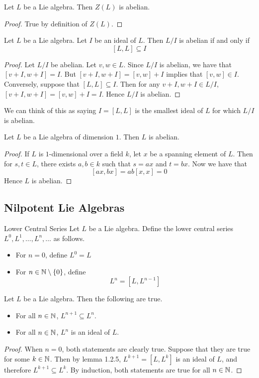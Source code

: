 \documentclass[a4paper]{article}
\begin{document}
\begin{lmm}{}{} Let $L$ be a Lie algebra. Then $Z(L)$ is abelian. \tcbline
\begin{proof}
True by definition of $Z(L)$. 
\end{proof}
\end{lmm}

\begin{lmm}{}{} Let $L$ be a Lie algebra. Let $I$ be an ideal of $L$. Then $L/I$ is abelian if and only if $$[L,L]\subseteq I$$ \tcbline
\begin{proof}
Let $L/I$ be abelian. Let $v,w\in L$. Since $L/I$ is abelian, we have that $[v+I,w+I]=I$. But $[v+I,w+I]=[v,w]+I$ implies that $[v,w]\in I$. Conversely, suppose that $[L,L]\subseteq I$. Then for any $v+I,w+I\in L/I$, $[v+I,w+I]=[v,w]+I=I$. Hence $L/I$ is abelian. 
\end{proof}
\end{lmm}

We can think of this as saying $I=[L,L]$ is the smallest ideal of $L$ for which $L/I$ is abelian. 

\begin{prp}{}{} Let $L$ be a Lie algebra of dimension $1$. Then $L$ is abelian. \tcbline
\begin{proof}
If $L$ is $1$-dimensional over a field $k$, let $x$ be a spanning element of $L$. Then for $s,t\in L$, there exists $a,b\in k$ such that $s=ax$ and $t=bx$. Now we have that $$[ax,bx]=ab[x,x]=0$$ Hence $L$ is abelian. 
\end{proof}
\end{prp}

\subsection{Nilpotent Lie Algebras}
\begin{defn}{Lower Central Series}{} Let $L$ be a Lie algebra. Define the lower central series $L^0,L^1,\dots,L^n,\dots$ as follows. 
\begin{itemize}
\item For $n=0$, define $L^0=L$
\item For $n\in\mathbb{N}\setminus\{0\}$, define $$L^n=[L,L^{n-1}]$$
\end{itemize}
\end{defn}

\begin{lmm}{}{} Let $L$ be a Lie algebra. Then the following are true. 
\begin{itemize}
\item For all $n\in\mathbb{N}$, $L^{n+1}\subseteq L^n$. 
\item For all $n\in\mathbb{N}$, $L^n$ is an ideal of $L$. 
\end{itemize} \tcbline
\begin{proof}
When $n=0$, both statements are clearly true. Suppose that they are true for some $k\in\mathbb{N}$. Then by lemma 1.2.5, $L^{k+1}=[L,L^k]$ is an ideal of $L$, and therefore $L^{k+1}\subseteq L^k$. By induction, both statements are true for all $n\in\mathbb{N}$. 
\end{proof}
\end{lmm}
\end{document}
